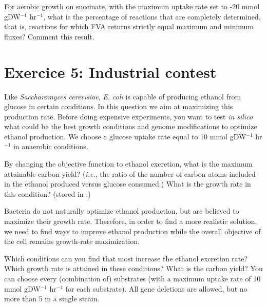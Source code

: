 \begin{questions}
\setcounter{question}{1}
\question For aerobic growth on succinate, with the maximum uptake rate set to -20 mmol gDW$^{-1}$ hr$^{-1}$, what is the percentage of reactions that are completely determined, that is, reactions for which FVA returns strictly equal maximum and minimum fluxes? Comment this result.

\begin{solutionorbox}[3cm]

\end{solutionorbox}
\end{questions}

\section*{Exercice 5: Industrial contest}
\setcounter{section}{5}

Like \textit{Saccharomyces cerevisiae}, \textit{E. coli} is capable of producing ethanol from glucose in certain conditions.
In this question we aim at maximizing this production rate.
Before doing expensive experiments, you want to test \textit{in silico} what could be the best growth conditions and genome modifications to optimize ethanol production.
We choose a glucose uptake rate equal to 10 mmol gDW$^{-1}$ hr$^{-1}$ in anaerobic conditions.

\begin{questions}
\setcounter{question}{0}
\question By changing the objective function to ethanol excretion, what is the maximum attainable carbon yield? (\textit{i.e.}, the ratio of the number of carbon atoms included in the ethanol produced versus glucose consumed.)
What is the growth rate in this condition? (stored in .)
\begin{solutionorbox}[2cm]

\end{solutionorbox}
\end{questions}

\noindent Bacteria do not naturally optimize ethanol production, but are believed to maximize their growth rate. Therefore, in order to find a more realistic solution, we need to find ways to improve ethanol production while the overall objective of the cell remains growth-rate maximization. 

\begin{questions}
\setcounter{question}{1}
\question Which conditions can you find that most increase the ethanol excretion rate?
Which growth rate is attained in these conditions?
What is the carbon yield?
You can choose every (combination of) substrates (with a maximum uptake rate of 10 mmol gDW$^{-1}$ hr$^{-1}$ for each substrate).
All gene deletions are allowed, but no more than 5 in a single strain.
\begin{solutionorbox}[10cm]

\end{solutionorbox}
\end{questions}

